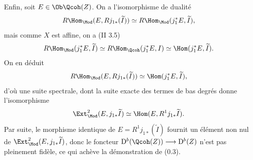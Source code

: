 Enfin, soit $E\in\Ob\Qcoh(Z)$. On a l'isomorphisme de dualité
\[
 R\Hom_{\Mod}(E,Rj_{1*}(\widetilde I))
 \simeq R\Hom_{\Mod}(j_1^*E,\widetilde I),
\]
mais comme $X$ est affine, on a (II 3.5)
\[
 R\Hom_{\Mod}(j_1^*E,\widetilde I)
 \simeq R\Hom_{\Qcoh}(j_1^*E,I)
 \simeq \Hom(j_1^*E,\widetilde I).
\]
On en déduit
\[
 R\Hom_{\Mod}(E,Rj_{1*}(\widetilde I))
 \simeq \Hom(j_1^*E,\widetilde I),
\]
d'où une suite spectrale, dont la suite exacte des termes de bas degrés donne l'isomorphisme
\[
 \Ext^2_{\Mod}(E,j_{1*}\widetilde I)
 \simeq \Hom(E,R^1j_{1*}\widetilde I).
\]
Par suite, le morphisme identique de $E=R^1j_{1*}(\widetilde I)$ fournit un élément non nul de $\Ext^2_{\Mod}(E,j_{1*}\widetilde I)$, donc le foncteur $\mathrm D^b(\Qcoh(Z))\longrightarrow \mathrm D^b(Z)$ n'est pas pleinement fidèle, ce qui achève la démonstration de (0.3).



\providecommand{\cO}{\mathcal O}
\providecommand{\cE}{\mathscr E}
\providecommand{\cF}{\mathscr F}
\providecommand{\cG}{\mathscr G}
\providecommand{\cH}{\mathcal H}
\providecommand{\cL}{\mathscr L}
\providecommand{\cP}{\mathscr P}
\providecommand{\cM}{\mathscr M}
\providecommand{\cD}{\mathcal D}
\providecommand{\R}{\mathbb R}
\providecommand{\C}{\mathbb C}
\providecommand{\N}{\mathbb N}
\providecommand{\Zell}{\mathbb Z_\ell}
\providecommand{\Qell}{\mathbb Q_\ell}
\providecommand{\C}{\mathbb C}
\providecommand{\Ch}{\operatorname{Ch}}
\providecommand{\Sym}{\operatorname{Sym}}
\providecommand{\Td}{\operatorname{Td}}
\providecommand{\Diff}{\operatorname{Diff}}
\providecommand{\Homop}{\operatorname{Hom}}
\providecommand{\Spec}{\operatorname{Spec}}
\providecommand{\pr}{\operatorname{pr}}
\providecommand{\ind}{\operatorname{ind}}
\providecommand{\soft}{\operatorname{soft}}
\providecommand{\Ban}{\operatorname{Ban}}
\providecommand{\Lop}{\operatorname{L}}
\providecommand{\im}{\operatorname{Im}}
\providecommand{\Parf}{\operatorname{Parf}}
\renewcommand{\id}{\operatorname{id}}

\newpage
